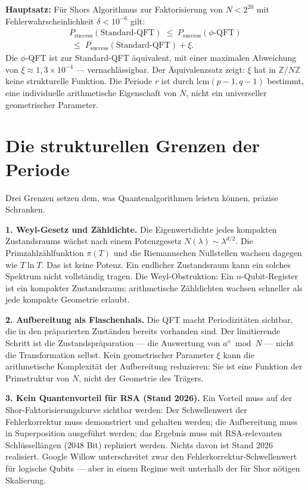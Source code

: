 \textbf{Hauptsatz:} Für Shors Algorithmus zur Faktorisierung von
$N < 2^{20}$ mit Fehlerwahrscheinlichkeit $\delta < 10^{-6}$ gilt:
\begin{multline}
  P_{\mathrm{success}}(\text{Standard-QFT})
  \;\le\; P_{\mathrm{success}}(\phi\text{-QFT})\\
  \;\le\; P_{\mathrm{success}}(\text{Standard-QFT})+\xi.
\end{multline}
Die $\phi$-QFT ist zur Standard-QFT äquivalent, mit einer maximalen
Abweichung von $\xi\approx1{,}3\times10^{-4}$ --- vernachlässigbar.
Der Äquivalenzsatz zeigt: $\xi$ hat in $\mathbb{Z}/N\mathbb{Z}$ keine
strukturelle Funktion. Die Periode $r$ ist durch $\mathrm{lcm}(p-1,q-1)$
bestimmt, eine individuelle arithmetische Eigenschaft von $N$, nicht ein
universeller geometrischer Parameter.

\section{Die strukturellen Grenzen der Periode}

Drei Grenzen setzen dem, was Quantenalgorithmen leisten können, präzise
Schranken.

\textbf{1. Weyl-Gesetz und Zähldichte.} Die Eigenwertdichte
jedes kompakten Zustandsraums wächst nach einem Potenzgesetz
$N(\lambda)\sim\lambda^{d/2}$. Die Primzahlzählfunktion $\pi(T)$ und die
Riemannschen Nullstellen wachsen dagegen wie $T\ln T$. Das ist keine
Potenz. Ein endlicher Zustandsraum kann ein solches Spektrum nicht
vollständig tragen. Die Weyl-Obstruktion: Ein $n$-Qubit-Register ist ein
kompakter Zustandsraum; arithmetische Zähldichten wachsen schneller als
jede kompakte Geometrie erlaubt.

\textbf{2. Aufbereitung als Flaschenhals.} Die QFT macht
Periodizitäten sichtbar, die in den präparierten Zuständen bereits
vorhanden sind. Der limitierende Schritt ist die Zustandspräparation
--- die Auswertung von $a^x\bmod N$ --- nicht die Transformation selbst.
Kein geometrischer Parameter $\xi$ kann die arithmetische Komplexität
der Aufbereitung reduzieren: Sie ist eine Funktion der Primstruktur von
$N$, nicht der Geometrie des Trägers.

\textbf{3. Kein Quantenvorteil für RSA (Stand 2026).} Ein
Vorteil muss auf der Shor-Faktorisierungskurve sichtbar werden: Der
Schwellenwert der Fehlerkorrektur muss demonstriert und gehalten werden;
die Aufbereitung muss in Superposition ausgeführt werden; das Ergebnis
muss mit RSA-relevanten Schlüssellängen (2048 Bit) repliziert werden.
Nichts davon ist Stand 2026 realisiert. Google Willow unterschreitet
zwar den Fehlerkorrektur-Schwellenwert für logische Qubits --- aber in
einem Regime weit unterhalb der für Shor nötigen Skalierung.

